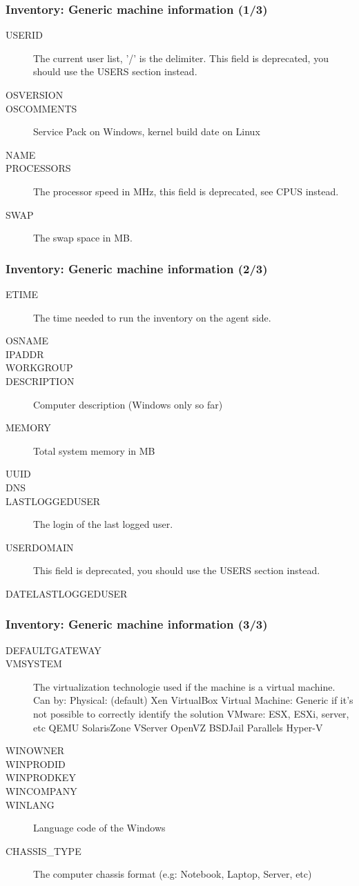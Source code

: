 \documentclass{beamer}
\begin{document}
\begin{frame}
\frametitle{Inventory: Generic machine information (1/3)}
\begin{description}
      \item[USERID] The current user list, '/' is the delimiter. This field is deprecated, you should use the USERS section instead.
      \item[OSVERSION]
      \item[OSCOMMENTS] Service Pack on Windows, kernel build date on Linux
      \item[NAME]
      \item[PROCESSORS] The processor speed in MHz, this field is deprecated, see CPUS instead.
      \item[SWAP] The swap space in MB.
\end{description}
\end{frame}
\begin{frame}
\frametitle{Inventory: Generic machine information (2/3)}
\begin{description}

      \item[ETIME] The time needed to run the inventory on the agent side.
      \item[OSNAME]
      \item[IPADDR]
      \item[WORKGROUP]
      \item[DESCRIPTION] Computer description (Windows only so far)
      \item[MEMORY] Total system memory in MB
      \item[UUID]
      \item[DNS]
      \item[LASTLOGGEDUSER] The login of the last logged user.
      \item[USERDOMAIN] This field is deprecated, you should use the USERS section instead.
      \item[DATELASTLOGGEDUSER]
\end{description}
\end{frame}
\begin{frame}
\frametitle{Inventory: Generic machine information  (3/3)}
\begin{description}
      \item[DEFAULTGATEWAY]
      \item[VMSYSTEM] The virtualization technologie used if the machine is a virtual machine.
 Can by:
 Physical: (default) Xen VirtualBox Virtual Machine: Generic if it's not possible to correctly identify the solution VMware: ESX, ESXi, server, etc QEMU SolarisZone VServer OpenVZ BSDJail Parallels Hyper-V
      \item[WINOWNER]
      \item[WINPRODID]
      \item[WINPRODKEY]
      \item[WINCOMPANY] 
      \item[WINLANG] Language code of the Windows
      \item[CHASSIS\_TYPE] The computer chassis format (e.g: Notebook, Laptop, Server, etc)
\end{description}
\end{frame}
\end{document}
